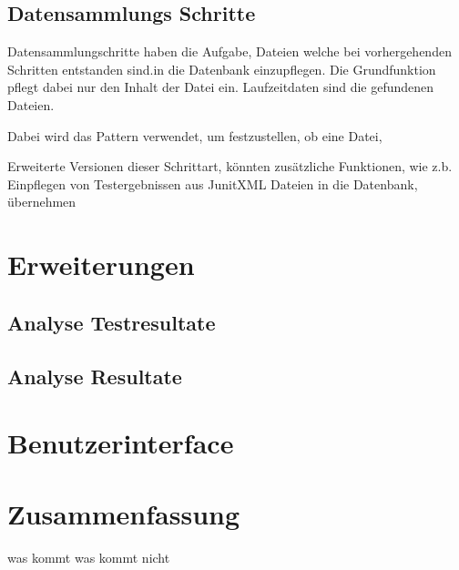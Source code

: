 \subsection{Datensammlungs Schritte}

Datensammlungschritte haben die Aufgabe,
Dateien welche bei vorhergehenden Schritten entstanden sind.in die Datenbank einzupflegen.
Die Grundfunktion pflegt dabei nur den Inhalt der Datei ein.
Laufzeitdaten sind die gefundenen Dateien.

Dabei wird das Pattern verwendet, um festzustellen, ob eine Datei, %

Erweiterte Versionen dieser Schrittart, k\"onnten zus\"atzliche Funktionen,
wie z.b. Einpflegen von Testergebnissen aus JunitXML Dateien in die Datenbank,
\"ubernehmen

\section{Erweiterungen}
\subsection{Analyse Testresultate}
\subsection{Analyse Resultate}


\section{Benutzerinterface}



\section{Zusammenfassung}

was kommt
was kommt nicht

